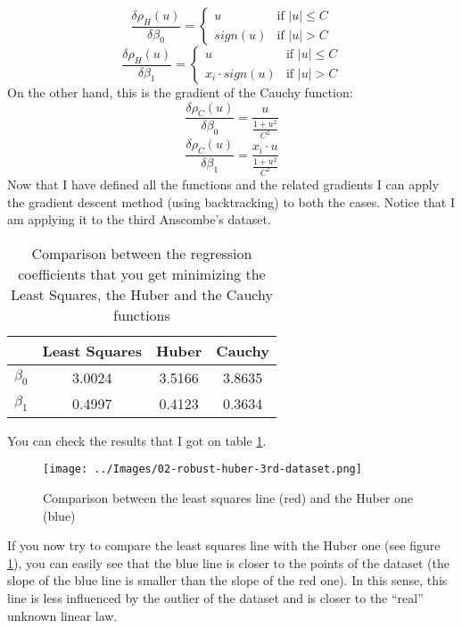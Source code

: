     \[
        \frac{\delta\rho_H(u)}{\delta\beta_0} =
        \begin{cases}
            u &         \text{if } |u| \leq C \\
            sign(u) &   \text{if } |u| > C
        \end{cases}    
    \]
    \[
        \frac{\delta\rho_H(u)}{\delta\beta_1} =
        \begin{cases}
            u &                     \text{if } |u| \leq C \\
            x_i \cdot sign(u) &     \text{if } |u| > C
        \end{cases}
    \]
    On the other hand, this is the gradient of the Cauchy function:
    \[
        \frac{\delta\rho_C(u)}{\delta\beta_0} = \frac{u}{\frac{1 + u^2}{C^2}}
    \]
    \[
        \frac{\delta\rho_C(u)}{\delta\beta_1} = \frac{x_i \cdot u}{\frac{1 + u^2}{C^2}}
    \]
    Now that I have defined all the functions and the related gradients I can apply the gradient descent method (using backtracking) to both the cases. Notice that I am applying it to the third Anscombe's dataset.
    \begin{table}
        \centering
        \begin{tabu}{| c | c | c | c |}
            \hline
            &               Least Squares &     Huber &     Cauchy \\ \hline
            \(\beta_0\) &   3.0024 &            3.5166 &    3.8635 \\ \hline
            \(\beta_1\) &   0.4997 &            0.4123 &    0.3634 \\ \hline
        \end{tabu}
        \caption{Comparison between the regression coefficients that you get minimizing the Least Squares, the Huber and the Cauchy functions}
        \label{comparison-coefficients}
    \end{table}
    You can check the results that I got on table \ref{comparison-coefficients}.\par
    \begin{figure}
        \centering
        \texttt{[image: ../Images/02-robust-huber-3rd-dataset.png]}
        \caption{Comparison between the least squares line (red) and the Huber one (blue)}
        \label{least-square-huber-lines-comparison}
    \end{figure}
    If you now try to compare the least squares line with the Huber one (see figure \ref{least-square-huber-lines-comparison}), you can easily see that the blue line is closer to the points of the dataset (the slope of the blue line is smaller than the slope of the red one). In this sense, this line is less influenced by the outlier of the dataset and is closer to the ``real'' unknown linear law.\par
